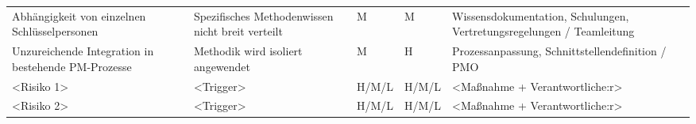 \begin{longtable}{@{}p{3.0cm}p{3.2cm}p{2.1cm}p{2.1cm}p{4.2cm}@{}}
Abhängigkeit von einzelnen Schlüsselpersonen 
& Spezifisches Methodenwissen nicht breit verteilt 
& M 
& M 
& Wissensdokumentation, Schulungen, Vertretungsregelungen / Teamleitung \\

Unzureichende Integration in bestehende PM-Prozesse 
& Methodik wird isoliert angewendet 
& M 
& H 
& Prozessanpassung, Schnittstellendefinition / PMO \\

\textless Risiko 1\textgreater & \textless Trigger\textgreater & H/M/L & H/M/L & \textless Maßnahme + Verantwortliche:r\textgreater \\
\textless Risiko 2\textgreater & \textless Trigger\textgreater & H/M/L & H/M/L & \textless Maßnahme + Verantwortliche:r\textgreater \\
\bottomrule
\end{longtable}